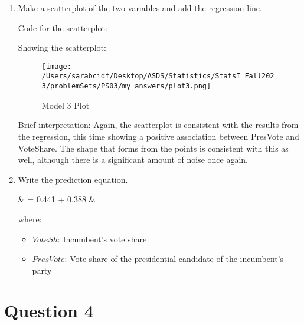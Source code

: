 \documentclass[12pt,letterpaper]{article}
\begin{document}
\begin{enumerate}
		\item Make a scatterplot of the two variables and add the regression line. \vspace{.25cm}
		
		Code for the scatterplot: 
		
		
		Showing the scatterplot: 
		\begin{figure}[H]
			\centering
			\texttt{[image: /Users/sarabcidf/Desktop/ASDS/Statistics/StatsI\_Fall2023/problemSets/PS03/my\_answers/plot3.png]}
			\caption{Model 3 Plot}
		\end{figure}
		
		Brief interpretation: 
		Again, the scatterplot is consistent with the results from the regression, this time showing a positive association between PresVote and VoteShare. The shape that forms from the points is consistent with this as well, although there is a significant amount of noise once again. 
			
		\item Write the prediction equation.
		
		{\setlength{\abovedisplayskip}{2pt} 
			\setlength{\belowdisplayskip}{6pt} 
			
			\begin{flalign*}
				& = 0.441 + 0.388 \cdot {}  &
			\end{flalign*}
			
			where: 
			
			\begin{itemize}
				\item $VoteSh$: Incumbent's vote share
				\item $PresVote$: Vote share of the presidential candidate of the incumbent's party
			\end{itemize}
		}
		
	\end{enumerate}
	

\newpage	
\section*{Question 4}
\end{document}
